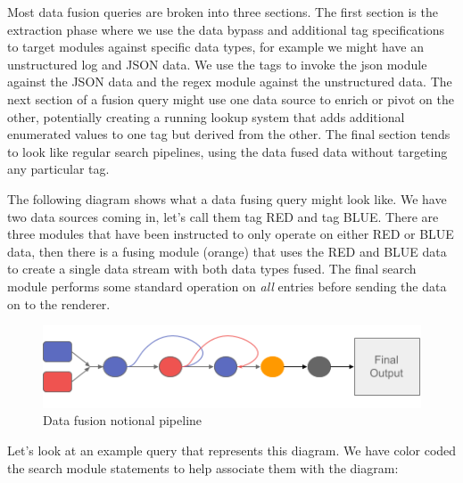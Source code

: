 Most data fusion queries are broken into three sections. The first section
is the extraction phase where we use the data bypass and additional
tag specifications to target modules against specific data types,
for example we might have an unstructured log and JSON data. We use
the tags to invoke the json module against the JSON data and the regex
module against the unstructured data. The next section of a fusion query
might use one data source to enrich or pivot on the other, potentially
creating a running lookup system that adds additional enumerated values
to one tag but derived from the other. The final section tends to look like
regular search pipelines, using the data fused data without targeting any particular tag.

The following diagram shows what a data fusing query might look like.
We have two data sources coming in, let's call them tag RED and tag
BLUE. There are three modules that have been instructed to only
operate on either RED or BLUE data, then there is a fusing
module (orange) that uses the RED and BLUE data to create a
single data stream with both data types fused. The final search module
performs some standard operation on \emph{all} entries before sending the data on to the
renderer.

\begin{figure}
	\includegraphics{images/data-fusion-pipeline.png}
	\caption{Data fusion notional pipeline}
	\label{fig:data-fusion-pipeline}
\end{figure}

Let's look at an example query that represents this diagram. We have
color coded the search module statements to help associate them with the
diagram:


